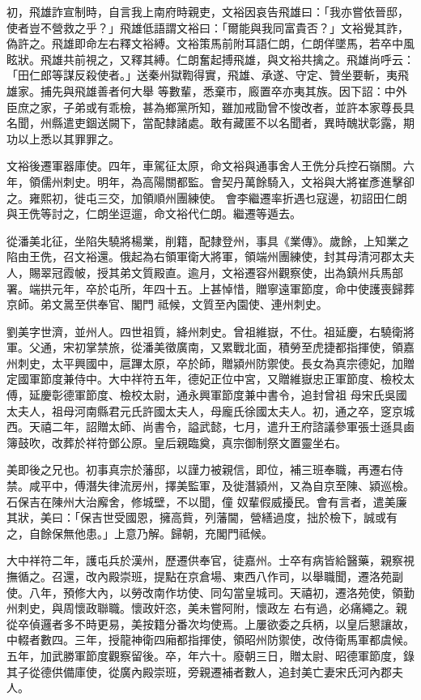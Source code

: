 \begin{pinyinscope}
 初，飛雄詐宣制時，自言我上南府時親吏，文裕因哀告飛雄曰：「我亦嘗依晉邸，使者豈不營救之乎？」飛雄低語謂文裕曰：「爾能與我同富貴否？」文裕覺其詐，偽許之。飛雄即命左右釋文裕縛。文裕策馬前附耳語仁朗，仁朗佯墜馬，若卒中風眩狀。飛雄共前視之，又釋其縛。仁朗奮起搏飛雄，與文裕共擒之。飛雄尚呼云：「田仁郎等謀反殺使者。」送秦州獄鞫得實，飛雄、承遂、守定、贊坐要斬，夷飛雄家。捕先與飛雄善者何大舉
 等數輩，悉棄市，廄置卒亦夷其族。因下詔：中外臣庶之家，子弟或有乖檢，甚為鄉黨所知，雖加戒勖曾不悛改者，並許本家尊長具名聞，州縣遣吏錮送闕下，當配隸諸處。敢有藏匿不以名聞者，異時醜狀彰露，期功以上悉以其罪罪之。



 文裕後遷軍器庫使。四年，車駕征太原，命文裕與通事舍人王侁分兵控石嶺關。六年，領儒州刺史。明年，為高陽關都監。會契丹萬餘騎入，文裕與大將崔彥進擊卻之。雍熙初，徙屯三交，加領順州團練使。
 會李繼遷率折遇乜寇邊，初詔田仁朗與王侁等討之，仁朗坐逗遛，命文裕代仁朗。繼遷等遁去。



 從潘美北征，坐陷失驍將楊業，削籍，配隸登州，事具《業傳》。歲餘，上知業之陷由王侁，召文裕還。俄起為右領軍衛大將軍，領端州團練使，封其母清河郡太夫人，賜翠冠霞帔，授其弟文質殿直。逾月，文裕遷容州觀察使，出為鎮州兵馬部署。端拱元年，卒於屯所，年四十五。上甚悼惜，贈寧遠軍節度，命中使護喪歸葬京師。弟文暠至供奉官、閣門
 祗候，文質至內園使、連州刺史。



 劉美字世濟，並州人。四世祖質，絳州刺史。曾祖維嶽，不仕。祖延慶，右驍衛將軍。父通，宋初掌禁旅，從潘美徵廣南，又累戰北面，積勞至虎捷都指揮使，領嘉州刺史，太平興國中，扈蹕太原，卒於師，贈潁州防禦使。長女為真宗德妃，加贈定國軍節度兼侍中。大中祥符五年，德妃正位中宮，又贈維嶽忠正軍節度、檢校太傅，延慶彰德軍節度、檢校太尉，通永興軍節度兼中書令，追封曾祖
 母宋氏吳國太夫人，祖母河南縣君元氏許國太夫人，母龐氏徐國太夫人。初，通之卒，窆京城西。天禧二年，詔贈太師、尚書令，謚武懿，七月，遣升王府諮議參軍張士遜具鹵簿鼓吹，改葬於祥符鄧公原。皇后親臨奠，真宗御制祭文置靈坐右。



 美即後之兄也。初事真宗於藩邸，以謹力被親信，即位，補三班奉職，再遷右侍禁。咸平中，傅潛失律流房州，擇美監軍，及徙潛潁州，又為自京至陳、潁巡檢。石保吉在陳州大治廨舍，修城壁，不以聞，僮
 奴輩假威擾民。會有言者，遣美廉其狀，美曰：「保吉世受國恩，擁高貲，列藩閫，營繕過度，拙於檢下，誠或有之，自餘保無他患。」上意乃解。歸朝，充閣門祗候。



 大中祥符二年，護屯兵於漢州，歷遷供奉官，徒嘉州。士卒有病皆給醫藥，親察視撫循之。召還，改內殿崇班，提點在京倉場、東西八作司，以舉職聞，遷洛苑副使。八年，預修大內，以勞改南作坊使、同勾當皇城司。天禧初，遷洛苑使，領勤州刺史，與周懷政聯職。懷政奸恣，美未嘗阿附，懷政左
 右有過，必痛繩之。親從卒偵邏者多不時更易，美按籍分番次均使焉。上屢欲委之兵柄，以皇后懇讓故，中輟者數四。三年，授龍神衛四廂都指揮使，領昭州防禦使，改侍衛馬軍都虞候。五年，加武勝軍節度觀察留後。卒，年六十。廢朝三日，贈太尉、昭德軍節度，錄其子從德供備庫使，從廣內殿崇班，旁親遷補者數人，追封美亡妻宋氏河內郡夫人。




\end{pinyinscope}
